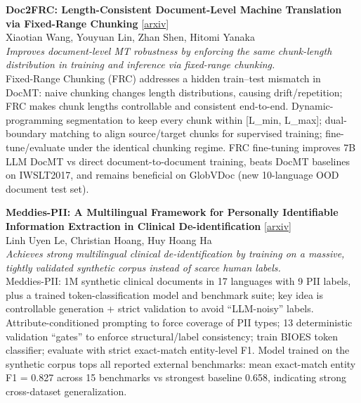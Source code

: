 \documentclass[12pt,letterpaper]{article}
\begin{document}
\medskip

{\small\textbf{Doc2FRC: Length-Consistent Document-Level Machine Translation via Fixed-Range Chunking}} {\scriptsize[\href{https://arxiv.org/abs/2609.12674}{arxiv}]}\\
{\scriptsize Xiaotian Wang, Youyuan Lin, Zhan Shen, Hitomi Yanaka}\\

{\small\textit{Improves document-level MT robustness by enforcing the same chunk-length distribution in training and inference via fixed-range chunking.}}\\[1pt]
{\footnotesize Fixed-Range Chunking (FRC) addresses a hidden train--test mismatch in DocMT: naive chunking changes length distributions, causing drift/repetition; FRC makes chunk lengths controllable and consistent end-to-end. Dynamic-programming segmentation to keep every chunk within [L\_min, L\_max]; dual-boundary matching to align source/target chunks for supervised training; fine-tune/evaluate under the identical chunking regime. FRC fine-tuning improves 7B LLM DocMT vs direct document-to-document training, beats DocMT baselines on IWSLT2017, and remains beneficial on GlobVDoc (new 10-language OOD document test set).}

\medskip

{\small\textbf{Meddies-PII: A Multilingual Framework for Personally Identifiable Information Extraction in Clinical De-identification}} {\scriptsize[\href{https://arxiv.org/abs/2609.12544}{arxiv}]}\\
{\scriptsize Linh Uyen Le, Christian Hoang, Huy Hoang Ha}\\

{\small\textit{Achieves strong multilingual clinical de-identification by training on a massive, tightly validated synthetic corpus instead of scarce human labels.}}\\[1pt]
{\footnotesize Meddies-PII: 1M synthetic clinical documents in 17 languages with 9 PII labels, plus a trained token-classification model and benchmark suite; key idea is controllable generation + strict validation to avoid ``LLM-noisy'' labels. Attribute-conditioned prompting to force coverage of PII types; 13 deterministic validation ``gates'' to enforce structural/label consistency; train BIOES token classifier; evaluate with strict exact-match entity-level F1. Model trained on the synthetic corpus tops all reported external benchmarks: mean exact-match entity F1 = 0.827 across 15 benchmarks vs strongest baseline 0.658, indicating strong cross-dataset generalization.}
\end{document}
